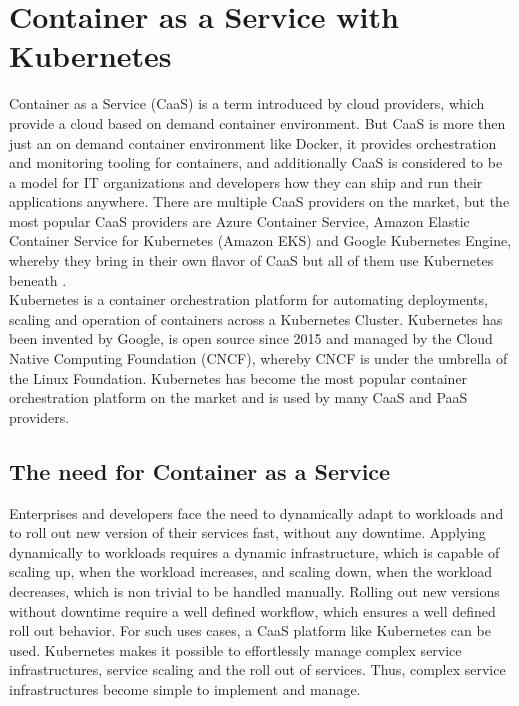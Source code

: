 \chapter{Container as a Service with Kubernetes}
\label{cha:caas}
Container as a Service (CaaS) is a term introduced by cloud providers, which provide a cloud based on demand container environment. But CaaS is more then just an on demand container environment like Docker, it provides orchestration and monitoring tooling for containers, and additionally CaaS is considered to be a model for IT organizations and developers how they can ship and run their applications anywhere. There are multiple CaaS providers on the market, but the most popular CaaS providers are Azure Container Service, Amazon Elastic Container Service for Kubernetes (Amazon EKS) and Google Kubernetes Engine, whereby they bring in their own flavor of CaaS but all of them use Kubernetes beneath \cite{CNCFKubernetes2018, MicrosoftAzureAKS2018, AmazonWebServicesEKS2018, GoogleCloudKE2018}. \\

Kubernetes is a container orchestration platform for automating deployments, scaling and operation of containers across a Kubernetes Cluster. Kubernetes has been invented by Google, is open source since 2015 and managed by the Cloud Native Computing Foundation (CNCF), whereby CNCF is under the umbrella of the Linux Foundation. Kubernetes has become the most popular container orchestration platform on the market and is used by many CaaS and PaaS providers\cite{CNCF2018}.

\section{The need for Container as a Service}
\label{sec:caas-need-for-caas}
Enterprises and developers face the need to dynamically adapt to workloads and to roll out new version of their services fast, without any downtime. Applying dynamically to workloads requires a dynamic infrastructure, which is capable of scaling up, when the workload increases, and scaling down, when the workload decreases, which is non trivial to be handled manually. Rolling out new versions without downtime require a well defined workflow, which ensures a well defined roll out behavior. For such uses cases, a CaaS platform like Kubernetes can be used. Kubernetes makes it possible to effortlessly manage complex service infrastructures, service scaling and the roll out of services. Thus, complex service infrastructures become simple to implement and manage. \\

